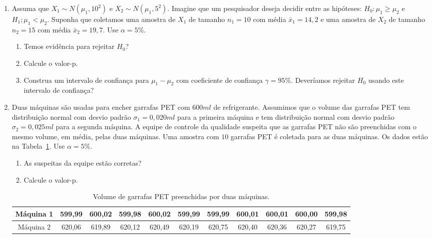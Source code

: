 \documentclass[8pt, a4paper]{article}
\begin{document}
\begin{enumerate}
	\item Assuma que $X_1 \sim N(\mu_1, 10^2)$ e $X_2 \sim N(\mu_1, 5^2)$. Imagine que um pesquisador deseja decidir entre as hipóteses: $H_0: \mu_1 \geq \mu_2$  e $H_1; \mu_1 < \mu_2$. Suponha que coletamos uma amostra de $X_1$ de tamanho $n_1=10$ com média $\bar{x}_1=14,2$ e uma amostra de $X_2$ de tamanho $n_2=15$ com média $\bar{x}_2=19,7$. Use $\alpha=5\%$.
	\begin{enumerate}
		\item Temos evidência para rejeitar $H_0$?
		\item Calcule o valor-p. 
		\item Construa um intervalo de confiança para $\mu_1 - \mu_2$ com coeficiente de confiança $\gamma=95\%$. Deveríamos rejeitar $H_0$ usando este intervalo de confiança?
	\end{enumerate}

	\item Duas máquinas são usadas para encher garrafas PET com $600ml$ de refrigerante. Assumimos que o volume das garrafas PET tem distribuição normal com desvio padrão $\sigma_1 = 0,020ml$ para a primeira máquina e tem distribuição normal com desvio padrão $\sigma_2 = 0,025ml$ para a segunda máquina. A equipe de controle da qualidade suspeita que as garrafas PET não são preenchidas com o mesmo volume, em média, pelas duas máquinas. Uma amostra com $10$ garrafas PET é coletada para as duas máquinas. Os dados estão na Tabela~\ref{tab:volume-pet}. Use $\alpha = 5\%$.
	\begin{enumerate}
		\item As suspeitas da equipe estão corretas?
		\item Calcule o valor-p.
	\end{enumerate}
	\begin{table}[ht]
		\centering
		\begin{tabular}{c|cccccccccc}
			\toprule[0.05cm]
			Máquina 1 & 599,99 & 600,02 & 599,98 & 600,02 & 599,99 & 599,99 & 600,01 & 600,01 & 600,00 & 599,98 \\ \midrule[0.025cm]
			Máquina 2 & 620,06 & 619,89 & 620,12 & 620,49 & 620,19 & 620,75 & 620,40 & 620,36 & 620,27 & 619,75 \\ 
			\bottomrule[0.05cm]
		\end{tabular}
		\caption{Volume de garrafas PET preenchidas por duas máquinas.} 
		\label{tab:volume-pet}
	\end{table}


\end{enumerate}
\end{document}
